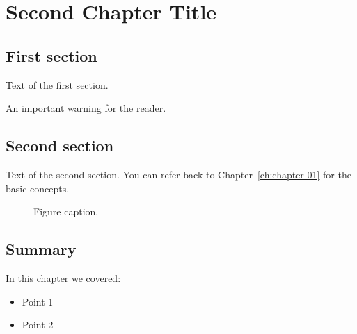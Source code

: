 
\chapter{Second Chapter Title}
\label{ch:chapter-02}


\section{First section}
\label{sec:02-section-1}

Text of the first section.

\begin{warnbox}
An important warning for the reader.
\end{warnbox}

\section{Second section}
\label{sec:02-section-2}

Text of the second section. You can refer back to
Chapter~\ref{ch:chapter-01} for the basic concepts.

\begin{figure}[H]
  \centering
  \caption{Figure caption.}
  \label{fig:02-example}
\end{figure}

\section{Summary}

In this chapter we covered:
\begin{itemize}
  \item Point 1
  \item Point 2
\end{itemize}
